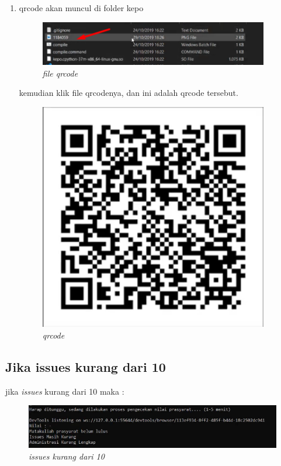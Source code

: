 \begin{enumerate}
\newpage

\item qrcode akan muncul di folder kepo

\begin{figure}[!htbp]
    \centering
    \includegraphics[width=10cm]{figures/qrcode}
    \caption{\textit{file qrcode}}
\end{figure}

kemudian klik file qrcodenya, dan ini adalah qrcode tersebut.
\begin{figure}[!htbp]
    \centering
    \includegraphics[width=10cm]{figures/iniqrcode}
    \caption{\textit{qrcode}}
\end{figure}

\end{enumerate}

\newpage

\subsection{Jika issues kurang dari 10}
\par jika \textit{issues} kurang dari 10 maka :

\begin{figure}[!htbp]
    \centering
    \includegraphics[width=15cm]{figures/issueskurang}
    \caption{\textit{issues kurang dari 10}}
\end{figure}

